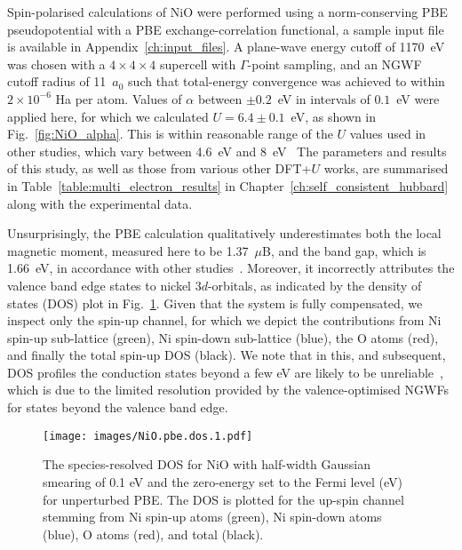 Spin-polarised calculations of NiO were performed   
using a norm-conserving PBE pseudopotential 
with a PBE exchange-correlation functional, 
a sample input file is available in 
Appendix~\ref{ch:input_files}.
%
A plane-wave energy cutoff of 1170~eV 
was chosen with a $4\times4\times4$ supercell 
with $\Gamma$-point sampling, 
and an NGWF cutoff radius of 11~$a_0$ 
such that total-energy convergence was achieved to 
within $2\times10^{-6}$ Ha per atom.
%
Values of $\alpha$ between $\pm0.2$~eV 
in intervals of $0.1$~eV were 
applied here,
for which we calculated $U=6.4\pm0.1$~eV, 
as shown in Fig.~\ref{fig:NiO_alpha}.
%
This is within reasonable 
range of the $U$ values used in other studies, 
which vary between 4.6~eV and 
8~eV~\cite{PhysRevB.71.035105,
PhysRevB.62.16392,
PhysRevB.44.943,
PhysRevB.60.10763,
PhysRevLett.102.226401}
%
The parameters and results of this study, 
as well as those from various other DFT+$U$ works, 
are summarised in Table~\ref{table:multi_electron_results} 
in Chapter~\ref{ch:self_consistent_hubbard}
along with the experimental data.


Unsurprisingly, 
the PBE calculation 
qualitatively underestimates both the 
local magnetic moment, 
measured here to be 1.37~$\mu$B, 
and the band gap, which is 1.66~eV, 
in accordance with other studies~\cite{PhysRevB.23.5048}.
%
Moreover, 
it incorrectly attributes the 
valence band edge states to nickel 3$d$-orbitals,  
as indicated by the density of states (DOS) 
plot in Fig.~\ref{fig:NiOpbedos}.
%
{
Given that the system is fully compensated, 
we inspect only the spin-up channel, 
for which we depict the contributions 
from Ni spin-up sub-lattice (green), 
Ni spin-down sub-lattice (blue), 
the O atoms (red), 
and finally the total spin-up DOS (black).}
%
{
We note that in this, and subsequent, DOS profiles 
the conduction states beyond a few eV 
are likely to be unreliable~\cite{PhysRevB.84.165131}, 
which is due to the limited resolution provided by 
the valence-optimised NGWFs for states 
beyond the valence band edge.}

\begin{figure}[th!]
\centering
\texttt{[image: images/NiO.pbe.dos.1.pdf]}
\caption[Species-resolved DOS for NiO calculated with PBE]
{The species-resolved DOS for NiO 
with half-width Gaussian smearing of 0.1 eV 
and the zero-energy set to the Fermi level (eV) for 
unperturbed PBE.
%
{
The DOS is plotted for the up-spin 
channel stemming from   
Ni spin-up atoms (green), 
Ni spin-down atoms (blue), 
O atoms (red), 
and total (black)}.}
\label{fig:NiOpbedos}
\end{figure}


